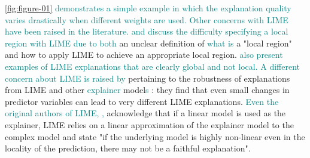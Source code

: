 \documentclass[AMS,STIX2COL]{WileyNJD-v2}\usepackage[]{graphicx}\usepackage[]{color}
\newcommand{\kge}[1]{\textcolor{teal}{#1}}
\renewcommand{\sout}[1]{\unskip}
\begin{document}
% 

\kge{\autoref{fig:figure-01} demonstrates a simple example in which the explanation quality varies drastically when different weights are used. Other concerns with LIME have been raised in the literature.} \sout{Several sources in the literature discuss the performance of LIME.} \kge{\citet{laugel:2018} and \citet{molnar:2019} discuss the difficulty specifying a local region with LIME due to both} \sout{One of the biggest difficulties with LIME is determining how to specify a local region \citep{laugel:2018} \citep{molnar:2019}. This is due to} an unclear definition of \kge{what is} a "local region" and how to apply LIME to achieve an appropriate local region\sout{ as demonstrated by \autoref{fig:figure-02}}. \kge{\citet{laugel:2018} also present examples of LIME explanations that are clearly global and not local.} \kge{A different concern about LIME is raised by} \citet{alvarezmelis:2018} \sout{raise a concern} pertaining to the robustness of explanations from LIME and other \kge{explainer} model\kge{s} \sout{explainers}: they find that even small changes in predictor variables can lead to very different LIME explanations. \kge{Even the original authors of LIME,} \sout{Additionally,} \citet{ribeiro:2016}\kge{,} acknowledge that if a linear model is used as the explainer, LIME relies on a linear approximation of the explainer model to the complex model and state "if the underlying model is highly non-linear even in the locality of the prediction, there may not be a faithful explanation".
\end{document}

